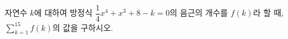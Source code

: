 자연수 $k$에 대하여 방정식 $\dfrac{1}{4}x^4+x^3+8-k=0$의 음근의 개수를 $f(k)$라 할 때, $\displaystyle\sum_{k=1}^{15} f(k)$의 값을 구하시오.
